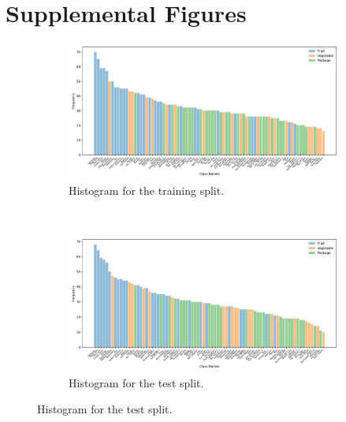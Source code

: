 

\section{Supplemental Figures}
\label{paperB:supp:supplemental_figures}

\begin{figure}[ht!]
    \centering
    \begin{minipage}{0.95\textwidth}
        \centering
        \begin{subfigure}[t]{0.82\linewidth}
        	\centering
        	\includegraphics[width=\textwidth]{PaperB/appendix/figures/class_distributions_histogram/class_dist_train.png}
        	\caption{Histogram for the training split.}
        	\label{fig:class_distribution_train}
        \end{subfigure} \\
        \begin{subfigure}[t]{0.82\linewidth}
			\centering
			\includegraphics[width=\textwidth]{PaperB/appendix/figures/class_distributions_histogram/class_dist_test.png}
			\caption{Histogram for the test split.}
			\label{fig:class_distribution_test}

\end{subfigure}
\end{minipage}
\end{figure}
